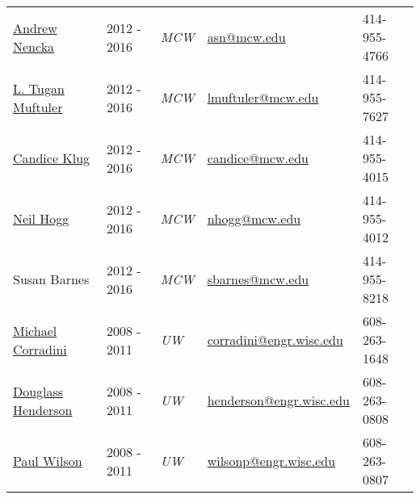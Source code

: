 
\begin{center}
\begin{minipage}{\textwidth}
\begin{tabular}{p{3.2cm}p{2.2cm}p{2.7cm}p{5.0cm}p{2.4cm}}
{\href{http://www.mcw.edu/radiology/faculty/Andrew-Nencka-PhD.htm}{Andrew Nencka}}\label{andrew_nencka} & {2012 - 2016}  & {\textit{MCW}}& \href{mailto:asn@mcw.edu}{asn@mcw.edu}  &  414-955-4766\\ %

{\href{http://neurosurgery.mcw.edu/faculty/research/muftuler/}{L. Tugan Muftuler}}\label{tugan_muftuler} & {2012 - 2016}  & {\textit{MCW}}& \href{mailto:lmuftuler@mcw.edu}{lmuftuler@mcw.edu}  &  414-955-7627\\ %

{\href{http://www.mcw.edu/biophysics/facultyandstaff/CandiceSKlug.htm}{Candice Klug}}\label{candice_klug} & {2012 - 2016}  & {\textit{MCW}}& \href{mailto:candice@mcw.edu}{candice@mcw.edu}  &  414-955-4015\\ %

{\href{http://www.mcw.edu/biophysics/facultyandstaff/NeilHogg.htm}{Neil Hogg}}\label{neil_hogg} & {2012 - 2016}  & {\textit{MCW}}& \href{mailto:nhogg@mcw.edu}{nhogg@mcw.edu} & 414-955-4012 \\ %

{Susan Barnes}\label{susan_barnes} & {2012 - 2016} & {\textit{MCW}} &  \href{mailto:sbarnes@mcw.edu}{sbarnes@mcw.edu} &   414-955-8218 \\ %

{\href{https://directory.engr.wisc.edu/ep/faculty/corradini\_michael}{Michael Corradini}}\label{michael_corradini}&{2008 - 2011} & {\textit{UW}}  &\href{mailto:corradini@engr.wisc.edu}{corradini@engr.wisc.edu} &  608-263-1648 \\ %

{\href{https://directory.engr.wisc.edu/ep/faculty/henderson\_douglass}{Douglass Henderson}}\label{douglass_henderson}& {2008 - 2011}  & {\textit{UW}}& \href{mailto:henderson@engr.wisc.edu}{henderson@engr.wisc.edu} &  608-263-0808 \\ %
  
{\href{https://directory.engr.wisc.edu/ep/faculty/wilson\_paul}{Paul Wilson}}\label{paul_wilson} & {2008 - 2011}  & {\textit{UW}}& \href{mailto:wilsonp@engr.wisc.edu}{wilsonp@engr.wisc.edu} &  608-263-0807 \\ %

\end{tabular}
\end{minipage}
\end{center}

